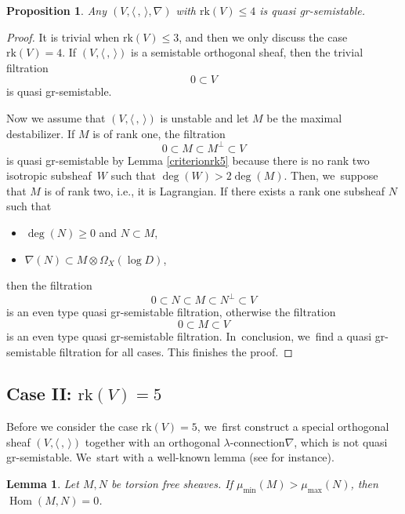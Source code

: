 \documentclass[11pt]{article}
\newcommand{\ie}{i.e.,\xspace}
\numberwithin{equation}{section}
\newcommand{\lconnection}{$\lambda$\nobreakdash-con\-nec\-tion\xspace}
\newcommand{\grsemistable}{gr\nobreakdash-semi\-stable\xspace}
\DeclareMathOperator{\Hom}{Hom}
\newcommand{\rk}{\mathrm{rk}}
\theoremstyle{plain}
\newtheorem{lem}[thm]{Lemma}
\newtheorem{prop}[thm]{Proposition}
\theoremstyle{definition}
\begin{document}
\begin{prop}\label{rank4}
Any $(V, \langle \,, \, \rangle, \nabla)$ with $\rk(V) \leq 4$ is quasi \grsemistable.
\end{prop}

\begin{proof}
It is trivial when $\rk(V)\leq3$, and then we only discuss the case $\rk(V)=4$. If $(V, \langle \,, \, \rangle)$ is a semistable orthogonal sheaf, then the trivial filtration\vspace*{-3pt}
\[
0\subset V
\]
is quasi \grsemistable.

Now we assume that $(V, \langle \,, \, \rangle)$ is unstable and let $M$ be the maximal destabilizer. If $M$ is of rank one, the filtration\vspace*{-3pt}
\[
0\subset M\subset M^\perp\subset V
\]
is quasi \grsemistable by Lemma \ref{criterionrk5} because there is no rank two isotropic subsheaf~$W$ such that $\deg(W) > 2 \deg(M)$. Then, we~suppose that $M$ is of rank two, \ie it is Lagrangian. If there exists a rank one subsheaf $N$ such that
\begin{itemize}
\item $\deg(N) \geq 0$ and $N \subset M$,
\item $\nabla(N) \subset M\otimes \Omega_X(\log D)$,
\end{itemize}
then the filtration\vspace*{-3pt}
\[
0\subset N\subset M\subset N^\perp\subset V
\]
is an even type quasi \grsemistable filtration, otherwise the filtration\vspace*{-3pt}
\[
0\subset M\subset V
\]
is an even type quasi \grsemistable filtration. In~conclusion, we~find a quasi \grsemistable filtration for all cases. This finishes the proof.
\end{proof}

\subsection{Case II: ${\rk(V) = 5}$}\label{subsect_rak_5}
Before we consider the case $\rk(V)=5$, we~first construct a special orthogonal sheaf $(V, \langle \,, \, \rangle)$ together with an orthogonal \lconnection $\nabla$, which is not quasi \grsemistable. We~start with a well-known lemma (see \cite[Lem.\,1.3.3]{HL97} for instance).

\begin{lem}\label{lem_max_min}
Let $M, N$ be torsion free sheaves. If $\mu_{\min}(M) > \mu_{\max}(N)$, then $\Hom(M,N) = 0$.
\end{lem}
\end{document}

